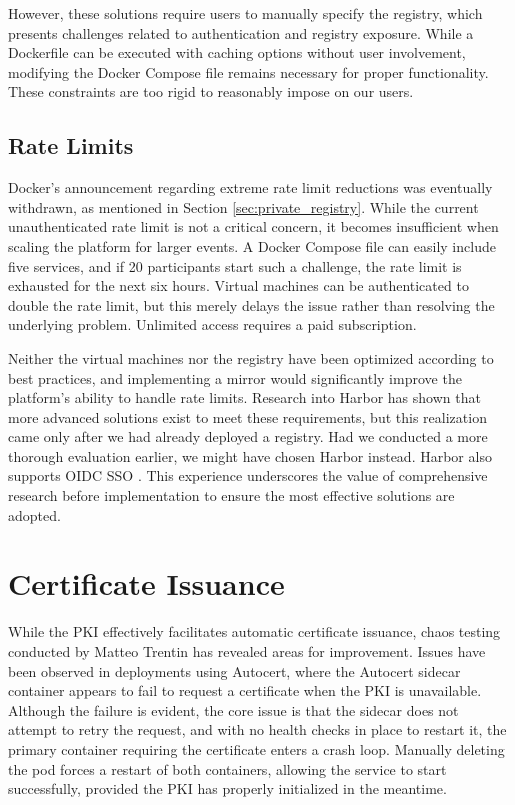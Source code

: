 However, these solutions require users to manually specify the registry, which presents challenges related to authentication and registry exposure. While a Dockerfile can be executed with caching options without user involvement, modifying the Docker Compose file remains necessary for proper functionality. These constraints are too rigid to reasonably impose on our users.

\subsection{Rate Limits}
Docker's announcement regarding extreme rate limit reductions was eventually withdrawn, as mentioned in Section \ref{sec:private_registry}. While the current unauthenticated rate limit is not a critical concern, it becomes insufficient when scaling the platform for larger events. A Docker Compose file can easily include five services, and if 20 participants start such a challenge, the rate limit is exhausted for the next six hours. Virtual machines can be authenticated to double the rate limit, but this merely delays the issue rather than resolving the underlying problem. Unlimited access requires a paid subscription.

Neither the virtual machines nor the registry have been optimized according to best practices, and implementing a mirror would significantly improve the platform's ability to handle rate limits. Research into Harbor has shown that more advanced solutions exist to meet these requirements, but this realization came only after we had already deployed a registry. Had we conducted a more thorough evaluation earlier, we might have chosen Harbor instead. Harbor also supports OIDC SSO \parencite{harbor_oidc}. This experience underscores the value of comprehensive research before implementation to ensure the most effective solutions are adopted.

\section{Certificate Issuance}
While the PKI effectively facilitates automatic certificate issuance, chaos testing conducted by Matteo Trentin has revealed areas for improvement. Issues have been observed in deployments using Autocert, where the Autocert sidecar container appears to fail to request a certificate when the PKI is unavailable. Although the failure is evident, the core issue is that the sidecar does not attempt to retry the request, and with no health checks in place to restart it, the primary container requiring the certificate enters a crash loop. Manually deleting the pod forces a restart of both containers, allowing the service to start successfully, provided the PKI has properly initialized in the meantime.

